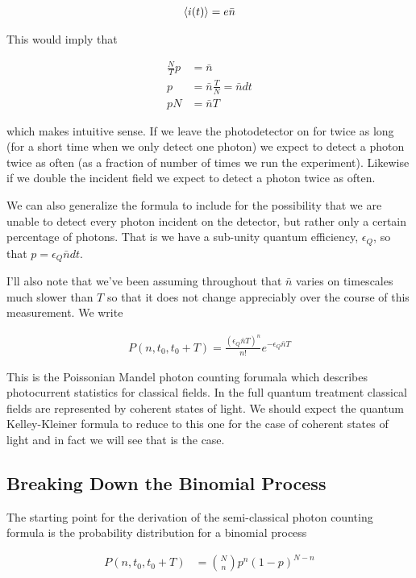 \documentclass[12pt]{article}
\begin{document}
\begin{align}
\Braket{i(t)} = e \bar{n}
\end{align}

This would imply that

\begin{align}
\frac{N}{T} p &= \bar{n}\\
p &= \bar{n} \frac{T}{N} = \bar{n} dt\\
pN &= \bar{n}T
\end{align}

which makes intuitive sense. If we leave the photodetector on for twice as long (for a short time when we only detect one photon) we expect to detect a photon twice as often (as a fraction of number of times we run the experiment). Likewise if we double the incident field we expect to detect a photon twice as often. 

We can also generalize the formula to include for the possibility that we are unable to detect every photon incident on the detector, but rather only a certain percentage of photons. That is we have a sub-unity quantum efficiency, $\epsilon_Q$, so that $p = \epsilon_Q \bar{n} dt$.

I'll also note that we've been assuming throughout that $\bar{n}$ varies on timescales much slower than $T$ so that it does not change appreciably over the course of this measurement.
We write

\begin{align}
P(n,t_0,t_0+T) = \frac{(\epsilon_Q \bar{n} T)^n}{n!} e^{-\epsilon_Q \bar{n}T}
\end{align}

This is the Poissonian Mandel photon counting forumala which describes photocurrent statistics for classical fields. In the full quantum treatment classical fields are represented by coherent states of light. We should expect the quantum Kelley-Kleiner formula to reduce to this one for the case of coherent states of light and in fact we will see that is the case.

\subsection{Breaking Down the Binomial Process}

The starting point for the derivation of the semi-classical photon counting formula is the probability distribution for a binomial process

\begin{align}
P(n,t_0,t_0+T) &= \binom{N}{n} p^n(1-p)^{N-n}\\
\end{align}
\end{document}
